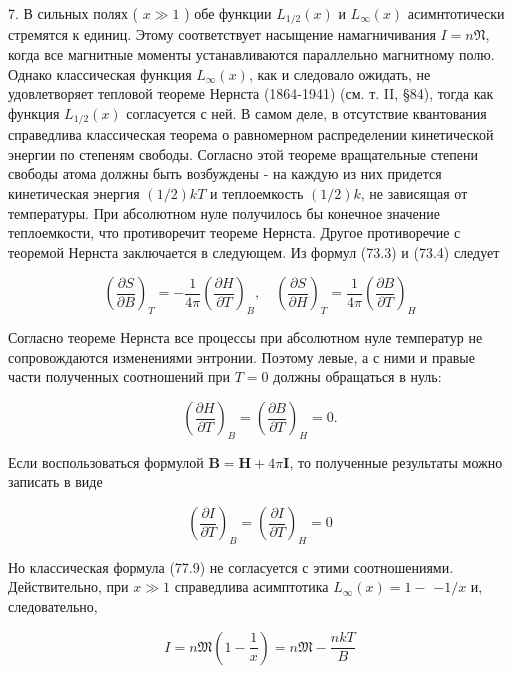 \documentclass[12pt]{article}
\begin{document}
  7. В сильных полях ( $x \gg 1$ ) обе функции $L_{1 / 2}(x)$ и $L_{\infty}(x)$ асимнтотически стремятся к единиц. Этому соответствует насыщение намагничивания $I=n \mathfrak{N}$, когда все магнитные моменты устанавливаются параллельно магнитному полю. Однако классическая функция $L_{\infty}(x)$, как и следовало ожидать, не удовлетворяет тепловой теореме Нернста (1864-1941) (см. т. II, §84), тогда как функция $L_{1 / 2}(x)$ согласуется с ней. В самом деле, в отсутствие квантования справедлива классическая теорема о равномерном распределении кинетической энергии по степеням свободы. Согласно этой теореме вращательные степени свободы атома должны быть возбуждены - на каждую из них придется кинетическая энергия $(1 / 2) k T$ и теплоемкость $(1 / 2) k$, не зависящая от температуры. При абсолютном нуле получилось бы конечное значение теплоемкости, что противоречит теореме Нернста. Другое противоречие с теоремой Нернста заключается в следующем. Из формул (73.3) и (73.4) следует

  $$
  \left(\frac{\partial S}{\partial B}\right)_T=-\frac{1}{4 \pi}\left(\frac{\partial H}{\partial T}\right)_B, \quad\left(\frac{\partial S}{\partial H}\right)_T=\frac{1}{4 \pi}\left(\frac{\partial B}{\partial T}\right)_H
  $$

  Согласно теореме Нернста все процессы при абсолютном нуле температур не сопровождаются изменениями энтронии. Поэтому левые, а с ними и правые части полученных соотношений при $T=0$ должны обращаться в нуль:

  $$
  \left(\frac{\partial H}{\partial T}\right)_B=\left(\frac{\partial B}{\partial T}\right)_H=0 .
  $$


  Если воспользоваться формулой $\mathbf{B}=\mathbf{H}+4 \pi \mathbf{I}$, то полученные результаты можно записать в виде

  $$
  \left(\frac{\partial I}{\partial T}\right)_B=\left(\frac{\partial I}{\partial T}\right)_H=0
  $$

  Но классическая формула (77.9) не согласуется с этими соотношениями. Действительно, при $x \gg 1$ справедлива асимптотика $L_{\infty}(x)=1-$ $-1 / x$ и, следовательно,

  $$
  I=n \mathfrak{M}\left(1-\frac{1}{x}\right)=n \mathfrak{M}-\frac{n k T}{B}
  $$
\end{document}
